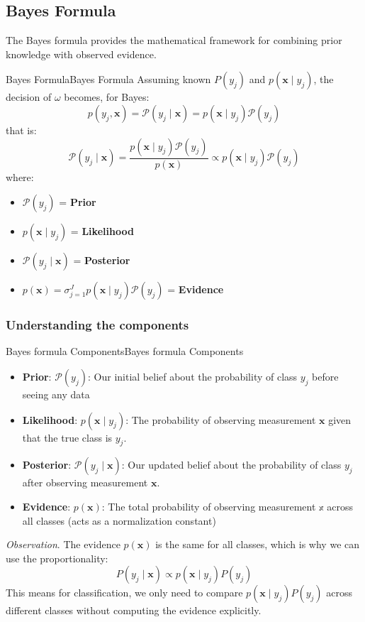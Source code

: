 \documentclass[a4paper]{article}
\theoremstyle{definition}
\begin{document}
\subsection{Bayes Formula}
The Bayes formula provides the mathematical framework for combining prior knowledge with observed evidence.
\begin{definition}{Bayes Formula}{Bayes Formula}
Assuming known \( P(y_j) \) and \( p(\mathbf{x} \;|\; y_j) \), the decision of \( \omega \) becomes, for Bayes:
\[
  p(y_j, \mathbf{x}) = \mathcal{P}(y_j \;|\; \mathbf{x}) = p(\mathbf{x} \;|\; y_j) \mathcal{P}(y_j)
\]
that is:
\[
  \mathcal{P}(y_j \;|\; \mathbf{x}) = \frac{p(\mathbf{x} \;|\; y_j) \mathcal{P}(y_j)}{p(\mathbf{x})} \propto p(\mathbf{x} \;|\; y_j) \mathcal{P}(y_j)
\]
where:
\begin{itemize}
    \item \( \mathcal{P}(y_j) \) = \textbf{Prior}
    \item \( p(\mathbf{x} \;|\; y_j) \) = \textbf{Likelihood}
    \item \( \mathcal{P}(y_j \;|\; \mathbf{x}) \) = \textbf{Posterior}
    \item \( p(\mathbf{x}) = \sigma_{j = 1}^{J} p(\mathbf{x} \;|\; y_j) \mathcal{P}(y_j) \) = \textbf{Evidence}
\end{itemize}
\end{definition}
\subsubsection{Understanding the components}
\begin{definition}{Bayes formula Components}{Bayes formula Components}
\begin{itemize}
    \item \textbf{Prior}: \( \mathcal{P}(y_j) \): Our initial belief about the probability of class \( y_j \) before seeing any data 
    \item \textbf{Likelihood}: \( p(\mathbf{x} \;|\; y_j) \): The probability of observing measurement \( \mathbf{x} \) given that the true class is \( y_j \).
    \item \textbf{Posterior}: \( \mathcal{P}(y_j \;|\; \mathbf{x}) \): Our updated belief about the probability of class \( y_j \) after observing measurement \( \mathbf{x} \).
    \item \textbf{Evidence}: \( p(\mathbf{x}) \): The total probability of observing measurement \( \mathbb{x} \) across all classes (acts as a normalization constant)
\end{itemize}
\end{definition}
\textit{Observation}. The evidence \( p(\mathbf{x}) \) is the same for all classes, which is why we can use the proportionality:
\[
  P(y_j \;|\; \mathbf{x}) \propto p(\mathbf{x} \;|\; y_j)P(y_j)
\]
This means for classification, we only need to compare \( p(\mathbf{x} \;|\; y_j)P(y_j) \) across different classes without 
computing the evidence explicitly.
\end{document}
